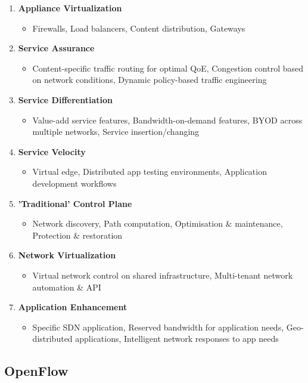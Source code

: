 \begin{enumerate}
\item \textbf{Appliance Virtualization}
	\begin{itemize}
	\item Firewalls, Load balancers, Content distribution, Gateways
	\end{itemize}
\item \textbf{Service Assurance}
	\begin{itemize}
	\item Content-specific traffic routing for optimal QoE, Congestion control based on network conditions, Dynamic policy-based traffic engineering 
	\end{itemize}
\item \textbf{Service Differentiation}
	\begin{itemize}
	\item Value-add service features, Bandwidth-on-demand features, BYOD across multiple networks, Service insertion/changing
	\end{itemize}
\item \textbf{Service Velocity}
	\begin{itemize}
	\item Virtual edge, Distributed app testing environments, Application development workflows 
	\end{itemize}
\item \textbf{'Traditional' Control Plane}
	\begin{itemize}
	\item Network discovery, Path computation, Optimisation \& maintenance, Protection \& restoration
	\end{itemize}
\item \textbf{Network Virtualization}
	\begin{itemize}
	\item Virtual network control on shared infrastructure, Multi-tenant network automation \& API
	\end{itemize}
\item \textbf{Application Enhancement}
	\begin{itemize}
	\item Specific SDN application, Reserved bandwidth for application needs, Geo-distributed applications, Intelligent network responses to app needs
	\end{itemize}
\end{enumerate}


\subsection{OpenFlow}
\label{sec:openflow}

